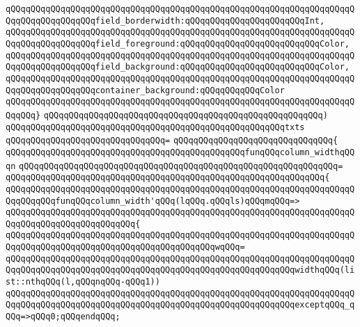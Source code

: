 \verb|qQQqqQQqqQQqqQQqqQQqqQQqqQQqqQQqqQQqqQQqqQQqqQQqqQQqqQQqqQQqqQQqqQQqqQQqqQQqqQQqqQQqqQQqfield_borderwidth:qQQqqQQqqQQqqQQqqQQqqQQqInt,|\newline
\verb|qQQqqQQqqQQqqQQqqQQqqQQqqQQqqQQqqQQqqQQqqQQqqQQqqQQqqQQqqQQqqQQqqQQqqQQqqQQqqQQqqQQqqQQqfield_foreground:qQQqqQQqqQQqqQQqqQQqqQQqqQQqColor,|\newline
\verb|qQQqqQQqqQQqqQQqqQQqqQQqqQQqqQQqqQQqqQQqqQQqqQQqqQQqqQQqqQQqqQQqqQQqqQQqqQQqqQQqqQQqqQQqfield_background:qQQqqQQqqQQqqQQqqQQqqQQqqQQqColor,|\newline
\verb|qQQqqQQqqQQqqQQqqQQqqQQqqQQqqQQqqQQqqQQqqQQqqQQqqQQqqQQqqQQqqQQqqQQqqQQqqQQqqQQqqQQqqQQqcontainer_background:qQQqqQQqqQQqColor|\newline
\verb|qQQqqQQqqQQqqQQqqQQqqQQqqQQqqQQqqQQqqQQqqQQqqQQqqQQqqQQqqQQqqQQqqQQqqQQqqQQq}|\newline
\verb|qQQqqQQqqQQqqQQqqQQqqQQqqQQqqQQqqQQqqQQqqQQqqQQqqQQqqQQq)|\newline
\verb|qQQqqQQqqQQqqQQqqQQqqQQqqQQqqQQqqQQqqQQqqQQqqQQqqQQqqQQqtxts|\newline
\verb|qQQqqQQqqQQqqQQqqQQqqQQqqQQqqQQq=|\newline
\verb|qQQqqQQqqQQqqQQqqQQqqQQqqQQqqQQq{|\newline
\verb|qQQqqQQqqQQqqQQqqQQqqQQqqQQqqQQqqQQqqQQqqQQqqQQqfunqQQqcolumn_widthqQQqn|\newline
\verb|qQQqqQQqqQQqqQQqqQQqqQQqqQQqqQQqqQQqqQQqqQQqqQQqqQQqqQQqqQQqqQQq=|\newline
\verb|qQQqqQQqqQQqqQQqqQQqqQQqqQQqqQQqqQQqqQQqqQQqqQQqqQQqqQQqqQQqqQQq{|\newline
\verb|qQQqqQQqqQQqqQQqqQQqqQQqqQQqqQQqqQQqqQQqqQQqqQQqqQQqqQQqqQQqqQQqqQQqqQQqqQQqqQQqfunqQQqcolumn_width'qQQq(lqQQq.qQQqls)qQQqmqQQq=>|\newline
\verb|qQQqqQQqqQQqqQQqqQQqqQQqqQQqqQQqqQQqqQQqqQQqqQQqqQQqqQQqqQQqqQQqqQQqqQQqqQQqqQQqqQQqqQQqqQQqqQQq{|\newline
\verb|qQQqqQQqqQQqqQQqqQQqqQQqqQQqqQQqqQQqqQQqqQQqqQQqqQQqqQQqqQQqqQQqqQQqqQQqqQQqqQQqqQQqqQQqqQQqqQQqqQQqqQQqqQQqqQQqwqQQq=|\newline
\verb|qQQqqQQqqQQqqQQqqQQqqQQqqQQqqQQqqQQqqQQqqQQqqQQqqQQqqQQqqQQqqQQqqQQqqQQqqQQqqQQqqQQqqQQqqQQqqQQqqQQqqQQqqQQqqQQqqQQqqQQqqQQqqQQqwidthqQQq(list::nthqQQq(l,qQQqnqQQq-qQQq1))|\newline
\verb|qQQqqQQqqQQqqQQqqQQqqQQqqQQqqQQqqQQqqQQqqQQqqQQqqQQqqQQqqQQqqQQqqQQqqQQqqQQqqQQqqQQqqQQqqQQqqQQqqQQqqQQqqQQqqQQqqQQqqQQqqQQqqQQqexceptqQQq_qQQq=>qQQq0;qQQqendqQQq;|\newline
